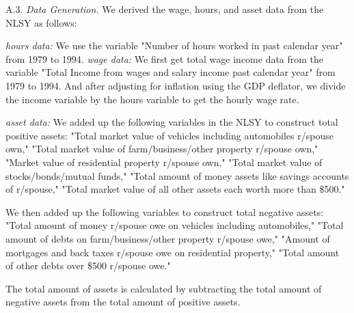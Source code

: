 \documentclass[\econtexRoot/ImaiKeane]{subfiles}
\begin{document}
\label{appendixA3}
\bigskip
\quad A.3.     \textit{Data Generation.}     We derived the wage, hours, and asset data from the NLSY as follows: \par
\medskip
\noindent \textit{hours data:} We use the variable "Number of hours worked in past calendar year" from 1979 to 1994.
\noindent \textit{wage data:} We first get total wage income data from the variable "Total Income from wages and salary income past calendar year" from 1979 to 1994. And after adjusting for inflation using the GDP deflator, we divide the income variable by the hours variable to get the hourly wage rate. \par
\noindent \textit{asset data:} We added up the following variables in the NLSY to construct total positive assets: "Total market value of vehicles including automobiles r/spouse own," "Total market value of farm/business/other property r/spouse own," "Market value of residential property r/spouse own," "Total market value of stocks/bonds/mutual funds," "Total amount of money assets like savings accounts of r/spouse," "Total market value of all other assets each worth more than \$500." \par
We then added up the following variables to construct total negative assets: "Total amount of money r/spouse owe on vehicles including automobiles," "Total amount of debts on farm/business/other property r/spouse owe," "Amount of mortgages and back taxes r/spouse owe on residential property," "Total amount of other debts over \$500 r/spouse owe." \par
The total amount of assets is calculated by subtracting the total amount of negative assets from the total amount of positive assets.
\end{document}
